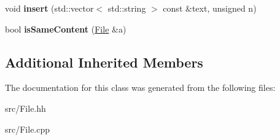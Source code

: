 \begin{DoxyCompactItemize}
\item 
\hypertarget{classstb_1_1File_a46c4bea359aeb0e812842dc56360551a}{void {\bfseries insert} (std\+::vector$<$ std\+::string $>$ const \&text, unsigned n)}\label{classstb_1_1File_a46c4bea359aeb0e812842dc56360551a}

\item 
\hypertarget{classstb_1_1File_a8c1663d59e17bd785001eca06c78565c}{bool {\bfseries is\+Same\+Content} (\hyperlink{classstb_1_1File}{File} \&a)}\label{classstb_1_1File_a8c1663d59e17bd785001eca06c78565c}

\end{DoxyCompactItemize}
\subsection*{Additional Inherited Members}


The documentation for this class was generated from the following files\+:\begin{DoxyCompactItemize}
\item 
src/File.\+hh\item 
src/File.\+cpp\end{DoxyCompactItemize}

